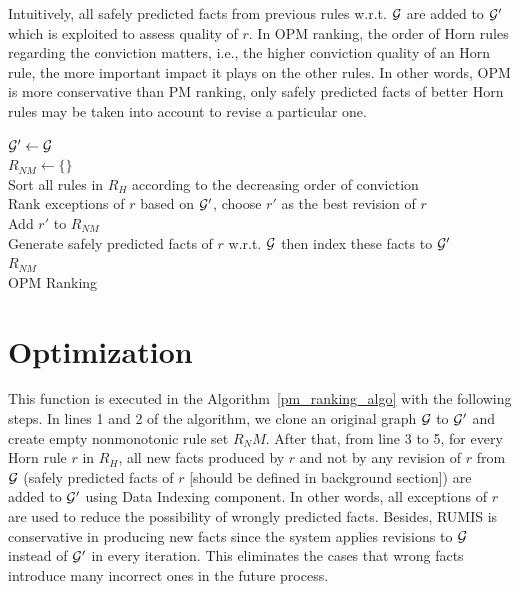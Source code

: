 Intuitively, all safely predicted facts from previous rules w.r.t. $\mathcal{G}$ are added to $\mathcal{G}'$ which is exploited to assess quality of $r$. In OPM ranking, the order of Horn rules regarding the conviction matters, i.e., the higher conviction quality of an Horn rule, the more important impact it plays on the other rules. In other words, OPM is more conservative than PM ranking, only safely predicted facts of better Horn rules may be taken into account to revise a particular one.

\IncMargin{1.5em}
\begin{algorithm}[H]
\DontPrintSemicolon
\SetAlgoLined
{}
\BlankLine
$\mathcal{G}' \leftarrow \mathcal{G}$\\
$R_{NM} \leftarrow \{\}$\\
Sort all rules in $R_H$ according to the decreasing order of conviction\\
\BlankLine
{} {
	Rank exceptions of $r$ based on $\mathcal{G}'$, choose $r'$ as the best revision of $r$\\
	Add $r'$ to $R_{NM}$\\
	Generate safely predicted facts of $r$ w.r.t. $\mathcal{G}$ then index these facts to $\mathcal{G}'$\\
}
\Return $R_{NM}$\\
\caption{OPM Ranking}
\label{opm_ranking_algo}
\end{algorithm}
\DecMargin{1.5em}

\section{Optimization}

This function is executed in the Algorithm~\ref{pm_ranking_algo} with the following steps. In lines 1 and 2 of the algorithm, we clone an original graph $\mathcal{G}$ to $\mathcal{G}'$ and create empty nonmonotonic rule set $R_NM$. After that, from line 3 to 5, for every Horn rule $r$ in $R_H$, all new facts produced by $r$ and not by any revision of $r$ from $\mathcal{G}$ (safely predicted facts of $r$ [should be defined in background section]) are added to $\mathcal{G}'$ using Data Indexing component. In other words, all exceptions of $r$ are used to reduce the possibility of wrongly predicted facts. Besides, RUMIS is conservative in producing new facts since the system applies revisions to $\mathcal{G}$ instead of $\mathcal{G}'$ in every iteration. This eliminates the cases that wrong facts introduce many incorrect ones in the future process. 

